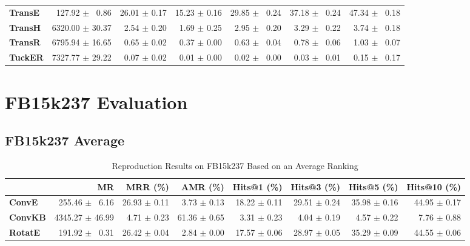 \documentclass[journal]{IEEEtran}
\begin{document}
\begin{table*}
\begin{tabular}{lrrrrrr}
\textbf{TransE  } &  $\phantom{5}$127.92 $\pm$ $\phantom{5}$0.86 &  26.01 $\pm$ 0.17 &  15.23 $\pm$ 0.16 &  29.85 $\pm$ $\phantom{5}$0.24 &  37.18 $\pm$ $\phantom{5}$0.24 &  47.34 $\pm$ $\phantom{5}$0.18 \\
\textbf{TransH  } &  6320.00 $\pm$ 30.37 &  $\phantom{5}$2.54 $\pm$ 0.20 &  $\phantom{5}$1.69 $\pm$ 0.25 &  $\phantom{5}$2.95 $\pm$ $\phantom{5}$0.20 &  $\phantom{5}$3.29 $\pm$ $\phantom{5}$0.22 &  $\phantom{5}$3.74 $\pm$ $\phantom{5}$0.18 \\
\textbf{TransR  } &  6795.94 $\pm$ 16.65 &  $\phantom{5}$0.65 $\pm$ 0.02 &  $\phantom{5}$0.37 $\pm$ 0.00 &  $\phantom{5}$0.63 $\pm$ $\phantom{5}$0.04 &  $\phantom{5}$0.78 $\pm$ $\phantom{5}$0.06 &  $\phantom{5}$1.03 $\pm$ $\phantom{5}$0.07 \\
\textbf{TuckER  } &  7327.77 $\pm$ 29.22 &  $\phantom{5}$0.07 $\pm$ 0.02 &  $\phantom{5}$0.01 $\pm$ 0.00 &  $\phantom{5}$0.02 $\pm$ $\phantom{5}$0.00 &  $\phantom{5}$0.03 $\pm$ $\phantom{5}$0.01 &  $\phantom{5}$0.15 $\pm$ $\phantom{5}$0.17 \\
\bottomrule
\end{tabular}

    \end{table*}

\section{FB15k237 Evaluation}
\subsection{FB15k237 Average}
\begin{table*}
    \caption{Reproduction Results on FB15k237 Based on an Average Ranking}
    \label{tab:fb15k237_full_results_average_ranking}
    \centering
    \begin{tabular}{lrrrrrrr}
\toprule
{} &               MR &      MRR (\%) &      AMR (\%) &   Hits@1 (\%) &   Hits@3 (\%) &   Hits@5 (\%) &  Hits@10 (\%) \\
\midrule
\textbf{ConvE } &  $\phantom{5}$255.46 $\pm$ $\phantom{5}$6.16 &  26.93 $\pm$ 0.11 &  $\phantom{5}$3.73 $\pm$ 0.13 &  18.22 $\pm$ 0.11 &  29.51 $\pm$ 0.24 &  35.98 $\pm$ 0.16 &  44.95 $\pm$ 0.17 \\
\textbf{ConvKB} &  4345.27 $\pm$ 46.99 &  $\phantom{5}$4.71 $\pm$ 0.23 &  61.36 $\pm$ 0.65 &  $\phantom{5}$3.31 $\pm$ 0.23 &  $\phantom{5}$4.04 $\pm$ 0.19 &  $\phantom{5}$4.57 $\pm$ 0.22 &  $\phantom{5}$7.76 $\pm$ 0.88 \\
\textbf{RotatE} &  $\phantom{5}$191.92 $\pm$ $\phantom{5}$0.31 &  26.42 $\pm$ 0.04 &  $\phantom{5}$2.84 $\pm$ 0.00 &  17.57 $\pm$ 0.06 &  28.97 $\pm$ 0.05 &  35.29 $\pm$ 0.09 &  44.55 $\pm$ 0.06 \\
\bottomrule
\end{tabular}

\end{table*}
\end{document}
